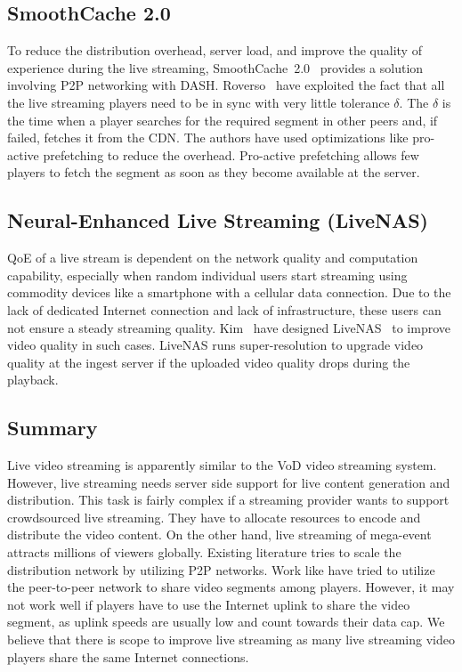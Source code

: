 \subsection{SmoothCache 2.0}
To reduce the distribution overhead, server load, and improve the quality of experience during the live streaming, SmoothCache~2.0~\cite{10.1145/2713168.2713182} provides a solution involving P2P networking with DASH. Roverso \etal\ have exploited the fact that all the live streaming players need to be in sync with very little tolerance $\delta$. The $\delta$ is the time when a player searches for the required segment in other peers and, if failed, fetches it from the CDN. The authors have used optimizations like pro-active prefetching to reduce the overhead. Pro-active prefetching allows few players to fetch the segment as soon as they become available at the server.

\subsection{Neural-Enhanced Live Streaming (LiveNAS)}
QoE of a live stream is dependent on the network quality and computation capability, especially when random individual users start streaming using commodity devices like a smartphone with a cellular data connection. Due to the lack of dedicated Internet connection and lack of infrastructure, these users can not ensure a steady streaming quality. Kim \etal\ have designed LiveNAS~\cite{10.1145/3387514.3405856} to improve video quality in such cases. LiveNAS runs super-resolution to upgrade video quality at the ingest server if the uploaded video quality drops during the playback.

\subsection{Summary}
Live video streaming is apparently similar to the VoD video streaming system. However, live streaming needs server side support for live content generation and distribution. This task is fairly complex if a streaming provider wants to support crowdsourced live streaming. They have to allocate resources to encode and distribute the video content. On the other hand, live streaming of mega-event attracts millions of viewers globally. Existing literature tries to scale the distribution network by utilizing P2P networks. Work like \cite{10.1145/2713168.2713182} have tried to utilize the peer-to-peer network to share video segments among players. However, it may not work well if players have to use the Internet uplink to share the video segment, as uplink speeds are usually low and count towards their data cap. We believe that there is scope to improve live streaming as many live streaming video players share the same Internet connections.